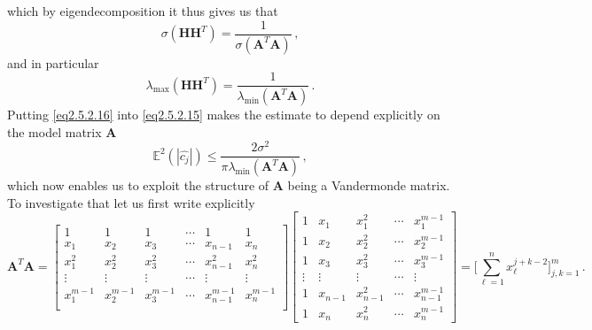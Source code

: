 \documentclass[../main.tex]{subfiles}
\begin{document}
which by eigendecomposition it thus gives us that
\begin{equation*}
     \sigma(\boldsymbol{H}\boldsymbol{H}^{T}) = \frac{1}{\sigma(\boldsymbol{A}^{T}\boldsymbol{A})}\,,
\end{equation*}
and in particular
\begin{equation}\label{eq2.5.2.16}
     \lambda_{\text{max}}(\boldsymbol{H}\boldsymbol{H}^{T}) = \frac{1}{\lambda_{\text{min}}(\boldsymbol{A}^{T}\boldsymbol{A})}\,.
\end{equation}
Putting \eqref{eq2.5.2.16} into \eqref{eq2.5.2.15} makes the estimate to depend explicitly on the model matrix $\boldsymbol{A}$
\begin{equation}\label{eq2.5.2.17}
      \mathbb{E}^{2}(|\hat{c_{j}}|)\leq\frac{2\sigma^{2}}{\pi\lambda_{\text{min}}(\boldsymbol{A}^{T}\boldsymbol{A})}\,,
\end{equation}
which now enables us to exploit the structure of $\boldsymbol{A}$ being a Vandermonde matrix.
To investigate that let us first write explicitly
\begin{equation*}
     \boldsymbol{A}^{T}\boldsymbol{A}=\begin{bmatrix}
             1 & 1 & 1 & \cdots & 1 & 1 \\
             x_{1} & x_{2} & x_{3} & \cdots & x_{n-1} & x_{n} \\
             x_{1}^{2} & x_{2}^{2} & x_{3}^{2} & \cdots & x_{n-1}^{2} & x_{n}^{2} \\
             \vdots & \vdots & \vdots & \cdots & \vdots & \vdots \\
             x_{1}^{m-1} & x_{2}^{m-1} & x_{3}^{m-1} & \cdots & x_{n-1}^{m-1} & x_{n}^{m-1} \\
     \end{bmatrix}\begin{bmatrix}
                        1 & x_{1} & x_{1}^{2} & \cdots  & x_{1}^{m-1} \\
                        1 & x_{2} & x_{2}^{2} & \cdots  & x_{2}^{m-1} \\
                        1 & x_{3} & x_{3}^{2} & \cdots  & x_{3}^{m-1} \\
                        \vdots &\vdots & \vdots & \cdots  & \vdots \\
                        1 & x_{n-1} & x_{n-1}^{2} & \cdots  & x_{n-1}^{m-1} \\
                        1 &x_{n} & x_{n}^{2} & \cdots  & x_{n}^{m-1}
                \end{bmatrix}
                =\Bigg[\sum_{\ell=1}^{n}x_{\ell}^{j+k-2}\Bigg]_{j,k=1}^{m}\,.
\end{equation*}
\end{document}
